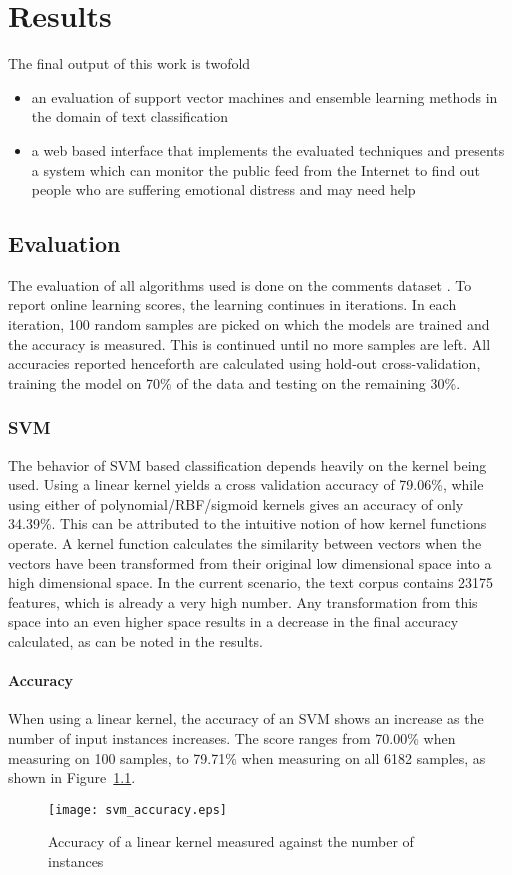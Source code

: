 \chapter{Results}
\label{chapter:Results}

The final output of this work is twofold
\begin{itemize}
    \item{an evaluation of support vector machines and ensemble learning methods in the domain of text classification}
    \item{a web based interface that implements the evaluated techniques and presents a system which can monitor the public feed from the Internet to find out people who are suffering emotional distress and may need help}
\end{itemize}

\section{Evaluation}
\label{section:evaluation}
The evaluation of all algorithms used is done on the comments dataset \cite{kaggle}. To report online learning scores, the learning continues in iterations. In each iteration, 100 random samples are picked on which the models are trained and the accuracy is measured. This is continued until no more samples are left. All accuracies reported henceforth are calculated using hold-out cross-validation, training the model on 70\% of the data and testing on the remaining 30\%.

\subsection{SVM}
The behavior of SVM based classification depends heavily on the kernel being used. Using a linear kernel yields a cross validation accuracy of 79.06\%, while using either of polynomial/RBF/sigmoid kernels gives an accuracy of only 34.39\%. This can be attributed to the intuitive notion of how kernel functions operate. A kernel function calculates the similarity between vectors when the vectors have been transformed from their original low dimensional space into a high dimensional space. In the current scenario, the text corpus contains 23175 features, which is already a very high number. Any transformation from this space into an even higher space results in a decrease in the final accuracy calculated, as can be noted in the results.

\subsubsection{Accuracy}
When using a linear kernel, the accuracy of an SVM shows an increase as the number of input instances increases. The score ranges from 70.00\% when measuring on 100 samples, to 79.71\% when measuring on all 6182 samples, as shown in Figure~\ref{svm_accuracy}.
\begin{figure}
    \centering
    \texttt{[image: svm\_accuracy.eps]}
    \caption{Accuracy of a linear kernel measured against the number of instances}
    \label{svm_accuracy}
\end{figure}

